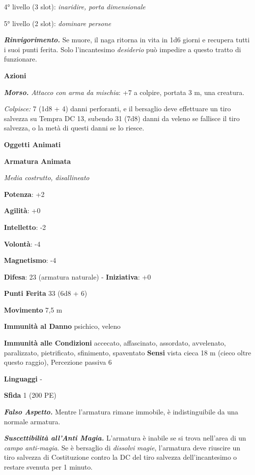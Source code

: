 \begin{multicols}{2}
4° livello (3 slot): \emph{inaridire, porta dimensionale}

5° livello (2 slot): \emph{dominare persone}

\emph{\textbf{Rinvigorimento.}} Se muore, il naga ritorna in vita in 1d6
giorni e recupera tutti i suoi punti ferita. Solo l'incantesimo
\emph{desiderio} può impedire a questo tratto di funzionare.

\textbf{Azioni}

\emph{\textbf{Morso.} Attacco con arma da mischia}: +7 a colpire,
portata 3 m, una creatura.

\emph{Colpisce:} 7 (1d8 + 4) danni perforanti, e il bersaglio deve
effettuare un tiro salvezza su Tempra DC 13, subendo 31 (7d8)
danni da veleno se fallisce il tiro salvezza, o la metà di questi danni
se lo riesce.

\textbf{Oggetti Animati}

\textbf{Armatura Animata}

\emph{Media costrutto, disallineato}

\textbf{Potenza}: +2

\textbf{Agilità}: +0

\textbf{Intelletto}: -2

\textbf{Volontà}: -4

\textbf{Magnetismo}: -4

\textbf{Difesa}: 23 (armatura naturale) - \textbf{Iniziativa}: +0

\textbf{Punti Ferita} 33 (6d8 + 6)

\textbf{Movimento} 7,5 m

\textbf{Immunità al Danno} psichico, veleno

\textbf{Immunità alle Condizioni} accecato, affascinato, assordato,
avvelenato, paralizzato, pietrificato, sfinimento, spaventato
\textbf{Sensi} vista cieca 18 m (cieco oltre questo raggio), Percezione
passiva 6

\textbf{Linguaggi} -

\textbf{Sfida} 1 (200 PE)

\emph{\textbf{Falso Aspetto.}} Mentre l'armatura rimane immobile, è
indistinguibile da una normale armatura.

\emph{\textbf{Suscettibilità all'Anti Magia.}} L'armatura è inabile se
si trova nell'area di un \emph{campo anti-magia}. Se è bersaglio di
\emph{dissolvi} \emph{magie}, l'armatura deve riuscire un tiro salvezza
di Costituzione contro la DC del tiro salvezza dell'incantesimo o
restare svenuta per 1 minuto.


\end{multicols}
